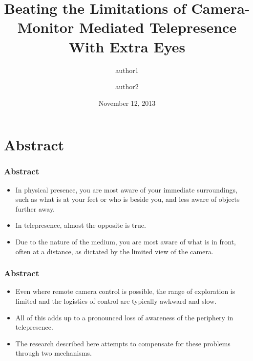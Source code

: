 \documentclass{beamer}
\begin{document}
\title{Beating the Limitations of Camera-Monitor Mediated Telepresence With Extra Eyes}

\author[author1 and author2]{author1
\and
author2}


\date{November 12, 2013}





\begin{frame}
\titlepage
\end{frame}

\section[Abstract]{Abstract}


\begin{frame}
\frametitle{Abstract}

\begin{itemize}
\item In physical presence, you are most aware of your immediate surroundings, such as what is at your feet or who is beside you, and less aware of objects further away.
\item In telepresence, almost the opposite is true.
\item Due to the nature of the medium, you are most aware of what is in front, often at a distance, as dictated by the limited view of the camera.
\end{itemize}

\end{frame}

\begin{frame}
\frametitle{Abstract}

\begin{itemize}
\item Even where remote camera control is possible, the range of exploration is limited and the logistics of control are typically awkward and slow.
\item All of this adds up to a pronounced loss of awareness of the periphery in telepresence.
\item The research described here attempts to compensate for these problems through two mechanisms.
\end{itemize}

\end{frame}
\end{document}
